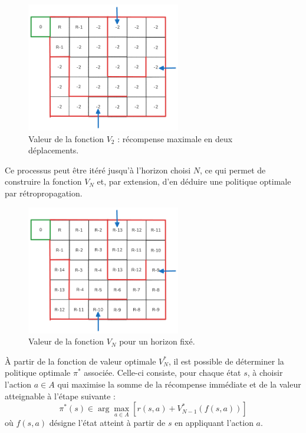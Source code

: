 \documentclass[12pt]{article}
\begin{document}
\vspace{1em}
\begin{figure}[h]
    \centering
    \includegraphics[width=0.6\textwidth]{labyrinthev2.png}
    \caption{Valeur de la fonction \(V_2\) : récompense maximale en deux déplacements.}
    \label{fig:V2}
\end{figure}

\vspace{0.5em}
\noindent Ce processus peut être itéré jusqu’à l’horizon choisi \(N\), ce qui permet de construire la fonction \(V_N\) et, par extension, d’en déduire une politique optimale par rétropropagation.

\begin{figure}[H]
    \centering
    \includegraphics[width=0.6\textwidth]{labyrintheVn.png}
    \caption{Valeur de la fonction \(V_N\) pour un horizon fixé.}
    \label{fig:Vn}
\end{figure}



À partir de la fonction de valeur optimale \(V_N^*\), il est possible de déterminer la politique optimale \(\pi^*\) associée. Celle-ci consiste, pour chaque état \(s\), à choisir l’action \(a \in A\) qui maximise la somme de la récompense immédiate et de la valeur atteignable à l’étape suivante :
\[
\pi^*(s) \in \arg\max_{a \in A} \left[ r(s,a) + V_{N-1}^*(f(s,a)) \right]
\]
où \(f(s,a)\) désigne l’état atteint à partir de \(s\) en appliquant l’action \(a\).
\end{document}
